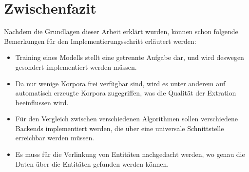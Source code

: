\section{Zwischenfazit}
Nachdem die Grundlagen dieser Arbeit erklärt wurden, können schon folgende Bemerkungen für den Implementierungsschritt erläutert werden:
\begin{itemize}
\item Training eines Modells stellt eine getrennte Aufgabe dar, und wird deswegen gesondert implementiert werden müssen.
\item Da nur wenige Korpora frei verfügbar sind, wird es unter anderem auf automatisch erzeugte Korpora zugegriffen, was die Qualität der Extration beeinflussen wird.
\item Für den Vergleich zwischen verschiedenen Algorithmen sollen verschiedene Backends implementiert werden, die über eine universale Schnittstelle erreichbar werden müssen.
\item Es muss für die Verlinkung von Entitäten nachgedacht werden, wo genau die Daten über die Entitäten gefunden werden können.
\end{itemize}
